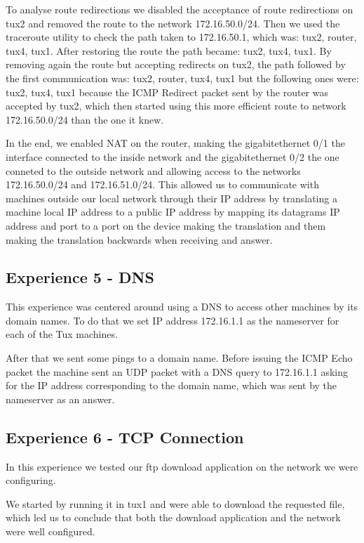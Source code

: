 \documentclass[11pt,a4paper,reqno]{article}
\numberwithin{equation}{section}
\begin{document}
To analyse route redirections we disabled the acceptance of route redirections on tux2 and removed the route to the network 172.16.50.0/24. Then we used the traceroute utility to check the path taken to 172.16.50.1, which was: tux2, router, tux4, tux1. After restoring the route the path became: tux2, tux4, tux1. By removing again the route but accepting redirects on tux2, the path followed by the first communication was: tux2, router, tux4, tux1 but the following ones were: tux2, tux4, tux1 because the ICMP Redirect packet sent by the router was accepted by tux2, which then started using this more efficient route to network 172.16.50.0/24 than the one it knew.

In the end, we enabled NAT on the router, making the gigabitethernet 0/1 the interface connected to the inside network and the gigabitethernet 0/2 the one conneted to the outside network and allowing access to the networks 172.16.50.0/24 and 172.16.51.0/24. This allowed us to communicate with machines outside our local network through their IP address by translating a machine local IP address to a public IP address by mapping its datagrams IP address and port to a port on the device making the translation and them making the translation backwards when receiving and answer.

\subsection{Experience 5 - DNS}

This experience was centered around using a DNS to access other machines by its domain names. To do that we set IP address 172.16.1.1 as the nameserver for each of the Tux machines.

After that we sent some pings to a domain name. Before issuing the ICMP Echo packet the machine sent an UDP packet with a DNS query to 172.16.1.1 asking for the IP address corresponding to the domain name, which was sent by the nameserver as an answer.

\subsection{Experience 6 - TCP Connection}

In this experience we tested our ftp download application on the network we were configuring.

We started by running it in tux1 and were able to download the requested file, which led us to conclude that both the download application and the network were well configured.
\end{document}
